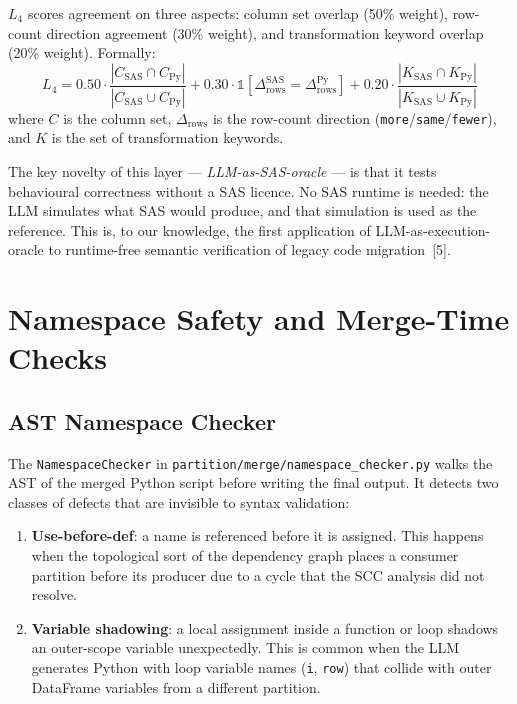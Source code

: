 $L_4$ scores agreement on three aspects: column set overlap (50\% weight),
row-count direction agreement (30\% weight), and transformation keyword overlap
(20\% weight). Formally:
\begin{equation}
  L_4 = 0.50 \cdot \frac{|C_{\text{SAS}} \cap C_{\text{Py}}|}{|C_{\text{SAS}} \cup C_{\text{Py}}|}
       + 0.30 \cdot \mathbb{1}[\Delta_{\text{rows}}^{\text{SAS}} = \Delta_{\text{rows}}^{\text{Py}}]
       + 0.20 \cdot \frac{|K_{\text{SAS}} \cap K_{\text{Py}}|}{|K_{\text{SAS}} \cup K_{\text{Py}}|}
  \label{eq:l4}
\end{equation}
where $C$ is the column set, $\Delta_{\text{rows}}$ is the row-count direction
(\texttt{more}/\texttt{same}/\texttt{fewer}), and $K$ is the set of
transformation keywords.

The key novelty of this layer --- \emph{LLM-as-SAS-oracle} --- is that it
tests behavioural correctness without a SAS licence. No SAS runtime is needed:
the LLM simulates what SAS would produce, and that simulation is used as the
reference. This is, to our knowledge, the first application of
LLM-as-execution-oracle to runtime-free semantic verification of legacy code
migration~[5].

\section{Namespace Safety and Merge-Time Checks}
\label{sec:namespace-impl}

\subsection{AST Namespace Checker}
\label{subsec:namespace-checker-impl}

The \texttt{NamespaceChecker} in
\texttt{partition/merge/namespace\_checker.py} walks the AST of the merged
Python script before writing the final output. It detects two classes of
defects that are invisible to syntax validation:

\begin{enumerate}
  \item \textbf{Use-before-def}: a name is referenced before it is assigned.
    This happens when the topological sort of the dependency graph places a
    consumer partition before its producer due to a cycle that the SCC
    analysis did not resolve.
  \item \textbf{Variable shadowing}: a local assignment inside a function or
    loop shadows an outer-scope variable unexpectedly. This is common when
    the LLM generates Python with loop variable names (\texttt{i}, \texttt{row})
    that collide with outer DataFrame variables from a different partition.
\end{enumerate}

